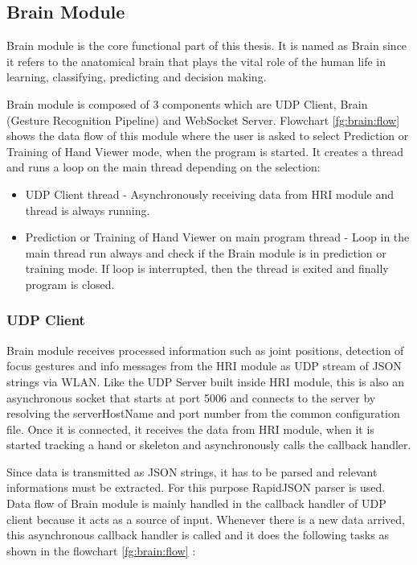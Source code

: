 \subsection{Brain Module} Brain module is the core functional part of this thesis. It is named as Brain since it refers to the anatomical brain that plays the vital role of the human life in learning, classifying, predicting and decision making. 

Brain module is composed of 3 components which are UDP Client, Brain (Gesture Recognition Pipeline) and WebSocket Server. Flowchart \ref{fg:brain:flow} shows the data flow of this module where the user is asked to select Prediction or Training of Hand Viewer mode, when the program is started. It creates a thread and runs a loop on the main thread depending on the selection: 

\begin{itemize}
	\item UDP Client thread - Asynchronously receiving data from HRI module and thread is always running.
	\item Prediction or Training of Hand Viewer on main program thread -  Loop in the main thread run always and check if the Brain module is in prediction or training mode. If loop is interrupted, then the thread is exited and finally program is closed.	
\end{itemize}



\subsubsection{UDP Client}
Brain module receives processed information such as joint positions, detection of focus gestures and info messages from the HRI module as UDP stream of JSON strings via WLAN. Like the UDP Server built inside HRI module, this is also an asynchronous socket that starts at port 5006 and connects to the server by resolving the serverHostName and port number from the common configuration file. Once it is connected, it receives the data from HRI module, when it is started tracking a hand or skeleton and asynchronously calls the callback handler.

Since data is transmitted as JSON strings, it has to be parsed and relevant informations must be extracted. For this purpose RapidJSON parser is used. Data flow of Brain module is mainly handled in the callback handler of UDP client because it acts as a source of input. Whenever there is a new data arrived, this asynchronous callback handler is called and it does the following tasks as shown in the flowchart \ref{fg:brain:flow} :

